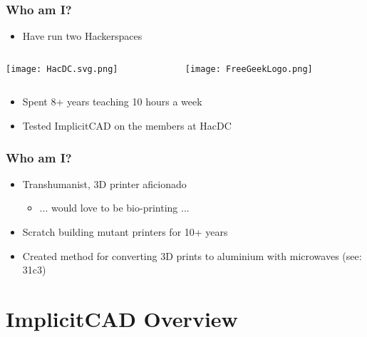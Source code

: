 \documentclass{beamer}
\begin{document}

\begin{frame}
\frametitle{Who am I?}
\begin{itemize}
\item Have run two Hackerspaces
\end{itemize}
\begin{columns}
  \begin{column}{0.5\textwidth}
    \texttt{[image: HacDC.svg.png]}
  \end{column}
  \begin{column}{0.5\textwidth}
    \texttt{[image: FreeGeekLogo.png]}
  \end{column}
\end{columns}
\begin{itemize}
\item Spent 8+ years teaching 10 hours a week
\item Tested ImplicitCAD on the members at HacDC
\end{itemize}
\end{frame}

\begin{frame}
\frametitle{Who am I?}
\begin{itemize}
\item Transhumanist, 3D printer aficionado
\begin{itemize}
\item ... would love to be bio-printing ...
\end{itemize}
\item Scratch building mutant printers for 10+ years
\item Created method for converting 3D prints to aluminium with microwaves (see: 31c3)
\end{itemize}
\end{frame}


\section{ImplicitCAD Overview}
\end{document}
